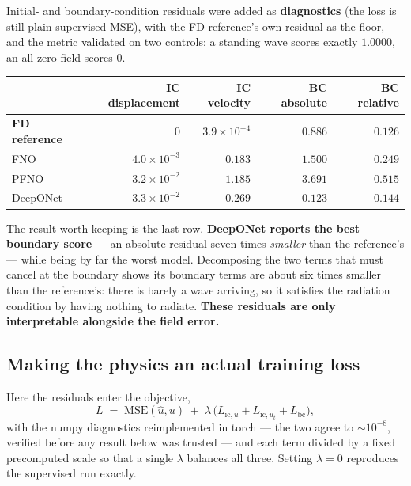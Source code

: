 \documentclass[11pt,a4paper]{article}
\begin{document}
Initial- and boundary-condition residuals were added as \textbf{diagnostics}
(the loss is still plain supervised MSE), with the FD reference's own residual
as the floor, and the metric validated on two controls: a standing wave scores
exactly $1.0000$, an all-zero field scores $0$.

\begin{center}
\small
\begin{tabular}{lrrrr}
\toprule
 & \textbf{IC displacement} & \textbf{IC velocity} & \textbf{BC absolute} & \textbf{BC relative}\\
\midrule
\textbf{FD reference} & $0$ & $3.9\!\times\!10^{-4}$ & $0.886$ & $0.126$\\
FNO      & $4.0\!\times\!10^{-3}$ & $0.183$ & $1.500$ & $0.249$\\
PFNO     & $3.2\!\times\!10^{-2}$ & $1.185$ & $3.691$ & $0.515$\\
DeepONet & $3.3\!\times\!10^{-2}$ & $0.269$ & $0.123$ & $\mathbf{0.144}$\\
\bottomrule
\end{tabular}
\end{center}

The result worth keeping is the last row. \textbf{DeepONet reports the best
boundary score} --- an absolute residual seven times \emph{smaller} than the
reference's --- while being by far the worst model. Decomposing the two terms
that must cancel at the boundary shows its boundary terms are about six times
smaller than the reference's: there is barely a wave arriving, so it satisfies
the radiation condition by having nothing to radiate. \textbf{These residuals
are only interpretable alongside the field error.}

\subsection{Making the physics an actual training loss}

Here the residuals enter the objective,
\[
L \;=\; \mathrm{MSE}(\hat u, u) \;+\; \lambda\,\bigl(L_{\mathrm{ic},u} + L_{\mathrm{ic},u_t} + L_{\mathrm{bc}}\bigr),
\]
with the numpy diagnostics reimplemented in torch --- the two agree to
$\sim10^{-8}$, verified before any result below was trusted --- and each term
divided by a fixed precomputed scale so that a single $\lambda$ balances all
three. Setting $\lambda=0$ reproduces the supervised run exactly.
\end{document}
